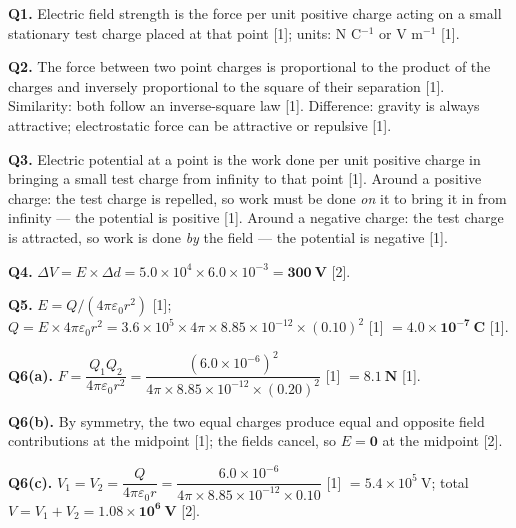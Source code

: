 \begin{markscheme}

\textbf{Q1.} Electric field strength is the force per unit positive charge acting on a small stationary test charge placed at that point [1]; units: N C$^{-1}$ or V m$^{-1}$ [1].

\vspace{0.5em}\textbf{Q2.} The force between two point charges is proportional to the product of the charges and inversely proportional to the square of their separation [1]. Similarity: both follow an inverse-square law [1]. Difference: gravity is always attractive; electrostatic force can be attractive or repulsive [1].

\vspace{0.5em}\textbf{Q3.} Electric potential at a point is the work done per unit positive charge in bringing a small test charge from infinity to that point [1]. Around a positive charge: the test charge is repelled, so work must be done \emph{on} it to bring it in from infinity — the potential is positive [1]. Around a negative charge: the test charge is attracted, so work is done \emph{by} the field — the potential is negative [1].

\vspace{0.5em}\textbf{Q4.} $\Delta V = E \times \Delta d = 5.0\times10^4 \times 6.0\times10^{-3} = \mathbf{300\ \text{V}}$ [2].

\vspace{0.5em}\textbf{Q5.} $E = Q/(4\pi\varepsilon_0 r^2)$ [1]; $Q = E \times 4\pi\varepsilon_0 r^2 = 3.6\times10^5 \times 4\pi\times8.85\times10^{-12}\times(0.10)^2$ [1] $= \mathbf{4.0\times10^{-7}\ \text{C}}$ [1].

\vspace{0.5em}\textbf{Q6(a).} $F = \dfrac{Q_1 Q_2}{4\pi\varepsilon_0 r^2} = \dfrac{(6.0\times10^{-6})^2}{4\pi\times8.85\times10^{-12}\times(0.20)^2}$ [1] $= \mathbf{8.1\ \text{N}}$ [1].

\vspace{0.5em}\textbf{Q6(b).} By symmetry, the two equal charges produce equal and opposite field contributions at the midpoint [1]; the fields cancel, so $E = \mathbf{0}$ at the midpoint [2].

\vspace{0.5em}\textbf{Q6(c).} $V_1 = V_2 = \dfrac{Q}{4\pi\varepsilon_0 r} = \dfrac{6.0\times10^{-6}}{4\pi\times8.85\times10^{-12}\times0.10}$ [1] $= 5.4\times10^5\ \text{V}$; total $V = V_1 + V_2 = \mathbf{1.08\times10^6\ \text{V}}$ [2].


\end{markscheme}
